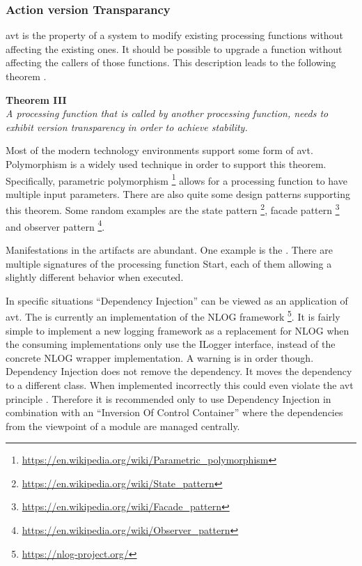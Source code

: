 \subsubsection{Action version Transparancy}
\gls{avt} is the property of a system to modify existing processing functions without
affecting the existing ones. It should be possible to upgrade a function without affecting
the callers of those functions. This description leads to the following theorem
\parencite[282]{mannaert_normalized_2016}.

\begin{center}
    \textbf{Theorem III}\\
    \textit{A processing function that is called by another processing function, needs to exhibit version transparency in order to achieve stability.}
\end{center}

Most of the modern technology environments support some form of \gls{avt}. Polymorphism is
a widely used technique in order to support this theorem. Specifically, parametric
polymorphism \footnote{\url{https://en.wikipedia.org/wiki/Parametric_polymorphism}} allows
for a processing function to have multiple input parameters. There are also quite some
design patterns supporting this theorem. Some random examples are the state pattern
\footnote{\url{https://en.wikipedia.org/wiki/State_pattern}}, facade pattern
\footnote{\url{https://en.wikipedia.org/wiki/Facade_pattern}} and observer pattern
\footnote{\url{https://en.wikipedia.org/wiki/Observer_pattern}}.

Manifestations in the artifacts are abundant. One example is the
 \parencite{koks_icommandlineinteractor_2023}.
There are multiple signatures of the processing function Start, each of them allowing a
slightly different behavior when executed.

In specific situations \enquote{Dependency Injection} can be viewed as an application of
\gls{avt}. The  \parencite{koks_logger_2023} is currently an
implementation of the NLOG framework \footnote{\url{https://nlog-project.org/}}. It is
fairly simple to implement a new logging framework as a replacement for NLOG when the
consuming implementations only use the ILogger interface, instead of the concrete NLOG
wrapper implementation. A warning is in order though. Dependency Injection does not remove
the dependency. It moves the dependency to a different class. When implemented incorrectly
this could even violate the \gls{avt} principle \parencite[213]{mannaert_normalized_2016}.
Therefore it is recommended only to use Dependency Injection in combination with an
\enquote{Inversion Of Control Container} where the dependencies from the viewpoint of a
module are managed centrally.

